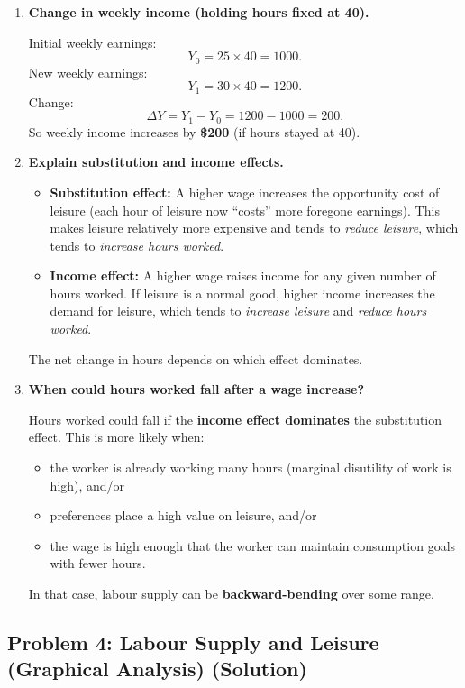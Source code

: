 \documentclass[12pt]{article}
\begin{document}
\begin{enumerate}
\item \textbf{Change in weekly income (holding hours fixed at 40).}

Initial weekly earnings:
\[
Y_0 = 25 \times 40 = 1000.
\]
New weekly earnings:
\[
Y_1 = 30 \times 40 = 1200.
\]
Change:
\[
\Delta Y = Y_1 - Y_0 = 1200 - 1000 = 200.
\]
So weekly income increases by \textbf{\$200} (if hours stayed at 40).

\item \textbf{Explain substitution and income effects.}

\begin{itemize}
\item \textbf{Substitution effect:} A higher wage increases the opportunity cost of leisure (each hour of leisure now ``costs'' more foregone earnings). This makes leisure relatively more expensive and tends to \emph{reduce leisure}, which tends to \emph{increase hours worked}.

\item \textbf{Income effect:} A higher wage raises income for any given number of hours worked. If leisure is a normal good, higher income increases the demand for leisure, which tends to \emph{increase leisure} and \emph{reduce hours worked}.
\end{itemize}

The net change in hours depends on which effect dominates.

\item \textbf{When could hours worked fall after a wage increase?}

Hours worked could fall if the \textbf{income effect dominates} the substitution effect. This is more likely when:
\begin{itemize}
\item the worker is already working many hours (marginal disutility of work is high), and/or
\item preferences place a high value on leisure, and/or
\item the wage is high enough that the worker can maintain consumption goals with fewer hours.
\end{itemize}
In that case, labour supply can be \textbf{backward-bending} over some range.
\end{enumerate}

\subsection*{Problem 4: Labour Supply and Leisure (Graphical Analysis) (Solution)}
\end{document}
